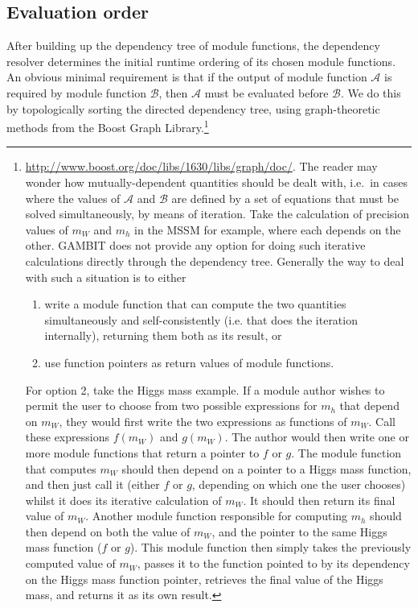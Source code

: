 \documentclass[pdftex,twocolumn,epjc3_preprint,runningheads]{svjour3}
\renewcommand{\_}{\discretionary{\underscore}{}{\underscore}}
\begin{document}
\subsection{Evaluation order}

After building up the dependency tree of module functions, the dependency resolver determines
the initial runtime ordering of its chosen module functions.  An obvious minimal
requirement is that if the output of module function $\mathcal{A}$ is required
by module function $\mathcal{B}$, then $\mathcal{A}$ must be evaluated before
$\mathcal{B}$.  We do this by topologically sorting the directed dependency
tree, using graph-theoretic methods from the \textsf{Boost Graph Library}.\footnote{\href{http://www.boost.org/doc/libs/1_63_0/libs/graph/doc/}{http://www.boost.org/doc/libs/1\_63\_0/libs/graph/doc/}.  The reader may wonder how mutually-dependent quantities should be dealt with, i.e.\ in cases where the values of $\mathcal{A}$ and $\mathcal{B}$ are defined by a set of equations that must be solved simultaneously, by means of iteration.  Take the calculation of precision values of $m_W$ and $m_h$ in the MSSM for example, where each depends on the other.  GAMBIT does not provide any option for doing such iterative calculations directly through the dependency tree.  Generally the way to deal with such a situation is to either\begin{enumerate}
\item write a module function that can compute the two quantities simultaneously and self-consistently (i.e. that does the iteration internally), returning them both as its result, or
\item use function pointers as return values of module functions.
\end{enumerate}
For option 2, take the Higgs mass example. If a module author wishes to permit the user to choose from two possible expressions for $m_h$ that depend on $m_W$, they would first write the two expressions as functions of $m_W$.  Call these expressions $f(m_W)$ and $g(m_W)$.  The author would then write one or more module functions that return a pointer to $f$ or $g$.  The module function that computes $m_W$ should then depend on a pointer to a Higgs mass function, and then just call it (either $f$ or $g$, depending on which one the user chooses) whilst it does its iterative calculation of $m_W$.  It should then return its final value of $m_W$.  Another module function responsible for computing $m_h$ should then depend on both the value of $m_W$, and the pointer to the same Higgs mass function ($f$ or $g$).  This module function then simply takes the previously computed value of $m_W$, passes it to the function pointed to by its dependency on the Higgs mass function pointer, retrieves the final value of the Higgs mass, and returns it as its own result.}
\end{document}
